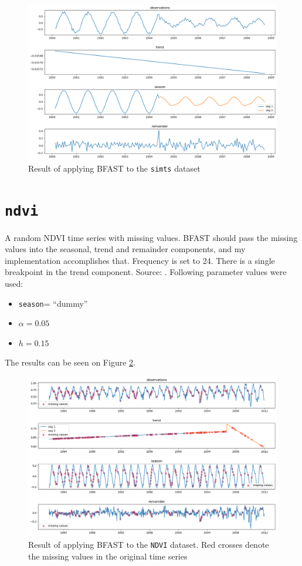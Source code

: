 \documentclass[main.tex]{subfiles}
\begin{document}
\begin{figure}
  \centering
  \includegraphics[width=\textwidth]{imgs/simts.png}
  \caption{Result of applying BFAST to the \texttt{simts} dataset}
  \label{plt:simts}
\end{figure}

\section{\texttt{ndvi}}
\label{sec:val_ndvi}
A random NDVI time series with missing values. BFAST should pass the missing
values into the seasonal, trend and remainder components, and my implementation
accomplishes that. Frequency is set to 24.
There is a single breakpoint in the trend component.
Source: \cite{bfast}. Following parameter values were used:
\begin{itemize}
\item \texttt{season}= ``dummy''
\item $\alpha = 0.05$
\item $h = 0.15$
\end{itemize}
The results can be seen on Figure \ref{plt:ndvi}.
\begin{figure}
  \centering
  \includegraphics[width=\textwidth]{imgs/ndvi.png}
  \caption{Result of applying BFAST to the \texttt{NDVI} dataset. Red crosses
    denote the missing values in the original time series}
  \label{plt:ndvi}
\end{figure}


\biblio
\end{document}
